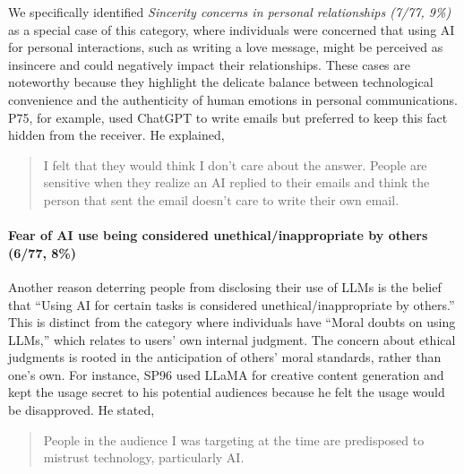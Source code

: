 We specifically identified \textit{Sincerity concerns in personal relationships (7/77, 9\%)} as a special case of this category, where individuals were concerned that using AI for personal interactions, such as writing a love message, might be perceived as insincere and could negatively impact their relationships.
These cases are noteworthy because they highlight the delicate balance between technological convenience and the authenticity of human emotions in personal communications.
P75, for example, used ChatGPT to write emails but preferred to keep this fact hidden from the receiver.
He explained,~\blockquote{I felt that they would think I don't care about the answer. People are sensitive when they realize an AI replied to their emails and think the person that sent the email doesn't care to write their own email.}


\paragraph{Fear of AI use being considered unethical/inappropriate by others (6/77, 8\%)} 
Another reason deterring people from disclosing their use of LLMs is the belief that ``Using AI for certain tasks is considered unethical/inappropriate by others.''
This is distinct from the category where individuals have ``Moral doubts on using LLMs,'' which relates to users' own internal judgment.
The concern about ethical judgments is rooted in the anticipation of others' moral standards, rather than one's own.
For instance, SP96 used LLaMA for creative content generation and kept the usage secret to his potential audiences because he felt the usage would be disapproved.
He stated,~\blockquote{People in the audience I was targeting at the time are predisposed to mistrust technology, particularly AI.}







